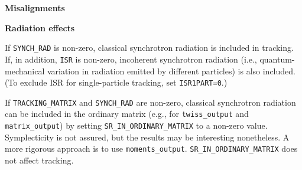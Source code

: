 {\bf Misalignments}



{\bf Radiation effects}

If \verb|SYNCH_RAD| is non-zero, classical synchrotron radiation is included in tracking.
If, in addition, \verb|ISR| is non-zero, incoherent synchrotron radiation (i.e., quantum-mechanical variation
in radiation emitted by different particles) is also included.
(To exclude ISR for single-particle tracking, set \verb|ISR1PART=0|.)

If \verb|TRACKING_MATRIX| and \verb|SYNCH_RAD| are non-zero, classical synchrotron radiation can be included in the
ordinary matrix (e.g., for \verb|twiss_output| and \verb|matrix_output|) by setting \verb|SR_IN_ORDINARY_MATRIX| to a
non-zero value. Symplecticity is not assured, but the results may be interesting nonetheless. A more rigorous approach
is to use \verb|moments_output|.  \verb|SR_IN_ORDINARY_MATRIX| does not affect tracking.
